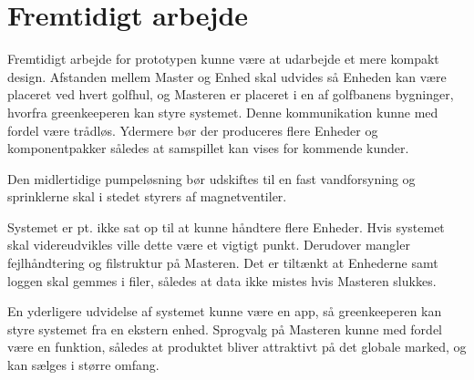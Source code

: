 \chapter{Fremtidigt arbejde}

Fremtidigt arbejde for prototypen kunne være at udarbejde et mere kompakt design. Afstanden mellem Master og Enhed skal udvides så Enheden kan være placeret ved hvert golfhul, og Masteren er placeret i en af golfbanens bygninger, hvorfra greenkeeperen kan styre systemet. Denne kommunikation kunne med fordel være trådløs. Ydermere bør der produceres flere Enheder og komponentpakker således at samspillet kan vises for kommende kunder. 

Den midlertidige pumpeløsning bør udskiftes til en fast vandforsyning og sprinklerne skal i stedet styrers af magnetventiler. 

Systemet er pt. ikke sat op til at kunne håndtere flere Enheder. Hvis systemet skal videreudvikles ville dette være et vigtigt punkt. Derudover mangler fejlhåndtering og filstruktur på Masteren. Det er tiltænkt at Enhederne samt loggen skal gemmes i filer, således at data ikke mistes hvis Masteren slukkes.

En yderligere udvidelse af systemet kunne være en app, så greenkeeperen kan styre systemet fra en ekstern enhed. Sprogvalg på Masteren kunne med fordel være en funktion, således at produktet bliver attraktivt på det globale marked, og kan sælges i større omfang.